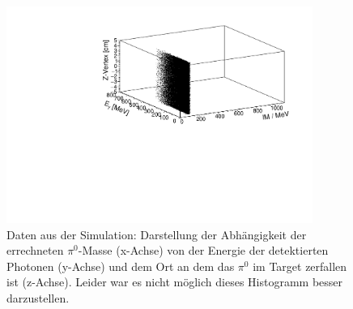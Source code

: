 \documentclass[a4paper,11pt,oneside,final,german,openbib,pdftex]{scrbook}
\begin{document}
{\begin{appendix}
\begin{figure}[h!]
	\begin{center}
		\includegraphics[width=100mm]{NewCalib/20171904SimZVertex3DHist}
		\caption[Simulation: 3D-Hist Z-Vertex]{Daten aus der Simulation: Darstellung der Abh\"angigkeit der errechneten $\pi^0$-Masse (x-Achse) von der Energie der detektierten Photonen (y-Achse) und dem Ort an dem das $\pi^0$ im Target zerfallen ist (z-Achse).
		Leider war es nicht m\"oglich dieses Histogramm besser darzustellen.}
	\label{fig:Z-Vertex-3D-Hist}
	\end{center}
\end{figure}

\end{appendix}}
\end{document}
